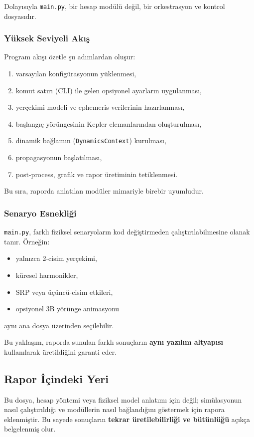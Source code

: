 Dolayısıyla \texttt{main.py}, bir hesap modülü değil, bir orkestrasyon ve kontrol dosyasıdır.

\subsubsection{Yüksek Seviyeli Akış}
Program akışı özetle şu adımlardan oluşur:
\begin{enumerate}
  \item varsayılan konfigürasyonun yüklenmesi,
  \item komut satırı (CLI) ile gelen opsiyonel ayarların uygulanması,
  \item yerçekimi modeli ve ephemeris verilerinin hazırlanması,
  \item başlangıç yörüngesinin Kepler elemanlarından oluşturulması,
  \item dinamik bağlamın (\texttt{DynamicsContext}) kurulması,
  \item propagasyonun başlatılması,
  \item post-process, grafik ve rapor üretiminin tetiklenmesi.
\end{enumerate}

Bu sıra, raporda anlatılan modüler mimariyle birebir uyumludur.

\subsubsection{Senaryo Esnekliği}
\texttt{main.py}, farklı fiziksel senaryoların
kod değiştirmeden çalıştırılabilmesine olanak tanır.
Örneğin:
\begin{itemize}
  \item yalnızca 2-cisim yerçekimi,
  \item küresel harmonikler,
  \item SRP veya üçüncü-cisim etkileri,
  \item opsiyonel 3B yörünge animasyonu
\end{itemize}
aynı ana dosya üzerinden seçilebilir.

Bu yaklaşım,
raporda sunulan farklı sonuçların
\textbf{aynı yazılım altyapısı} kullanılarak üretildiğini garanti eder.

\subsection*{Rapor İçindeki Yeri}
Bu dosya, hesap yöntemi veya fiziksel model anlatımı için değil;
simülasyonun nasıl çalıştırıldığı ve modüllerin nasıl bağlandığını göstermek için rapora eklenmiştir.
Bu sayede sonuçların \textbf{tekrar üretilebilirliği ve bütünlüğü}
açıkça belgelenmiş olur.

